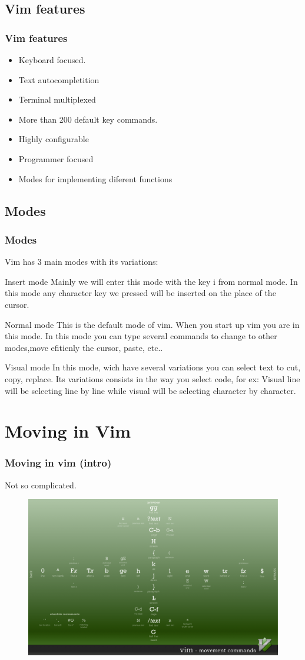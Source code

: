\documentclass{beamer}
\begin{document}
\subsection{Vim features}
\begin{frame}
  \frametitle{Vim features}
  \begin{itemize}
    \item Keyboard focused.
    \item Text autocompletition 
    \item Terminal multiplexed
    \item More than 200 default key commands.
    \item Highly configurable
    \item Programmer focused
    \item Modes for implementing diferent functions
  \end{itemize}
\end{frame}
\subsection{Modes}
\begin{frame}
  \frametitle{Modes}
  Vim has 3 main modes with its variations:
  \begin{block}{Insert mode}
    Mainly we will enter this mode with the key i from normal mode. In this mode any character key we pressed will be inserted on the place of the cursor.
  \end{block}
  \begin{block}{Normal mode}
    This is the default mode of vim. When you start up vim you are in this mode. In this mode you can type several commands to change to other modes,move efitienly the cursor, paste, etc..
  \end{block}
  \begin{block}{Visual mode}
    In this mode, wich have several variations you can select text to cut, copy, replace. Its variations consists in the way you select code, for ex: Visual line will be selecting line by line while visual will be selecting character by character.
  \end{block}
  \end{frame}
  \section{Moving in Vim}
  \begin{frame}
    \frametitle{Moving in vim (intro)}
    Not so complicated.
    \begin{figure}
      \includegraphics[width=0.8\linewidth]{movement.png}
    \end{figure}
   \end{frame}
\end{document}
